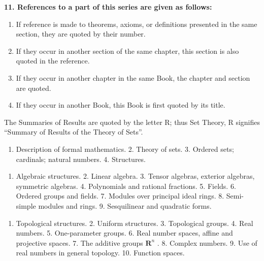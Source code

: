 \par\noindent\textbf{11. References to a part of this series are given as follows:}\par

\begin{enumerate}
\def\labelenumi{\alph{enumi})}
\item
  If reference is made to theorems, axioms, or definitions presented in the same section, they are quoted by their number.
\item
  If they occur in another section of the same chapter, this section is also quoted in the reference.
\item
  If they occur in another chapter in the same Book, the chapter and section are quoted.
\item
  If they occur in another Book, this Book is first quoted by its title.
\end{enumerate}

The Summaries of Results are quoted by the letter R; thus Set Theory, R signifies ``Summary of Results of the Theory of Sets''.



\begin{enumerate}
\def\labelenumi{\arabic{enumi}.}
\tightlist
\item
  Description of formal mathematics. 2. Theory of sets. 3. Ordered sets; cardinals; natural numbers. 4. Structures.
\end{enumerate}


\begin{enumerate}
\def\labelenumi{\arabic{enumi}.}
\tightlist
\item
  Algebraic structures. 2. Linear algebra. 3. Tensor algebras, exterior algebras, symmetric algebras. 4. Polynomials and rational fractions. 5. Fields. 6. Ordered groups and fields. 7. Modules over principal ideal rings. 8. Semi-simple modules and rings. 9. Sesquilinear and quadratic forms.
\end{enumerate}


\begin{enumerate}
\def\labelenumi{\arabic{enumi}.}
\tightlist
\item
  Topological structures. 2. Uniform structures. 3. Topological groups. 4. Real numbers. 5. One-parameter groups. 6. Real number spaces, affine and projective spaces. 7. The additive groups \(\mathbf{R}^n\) . 8. Complex numbers. 9. Use of real numbers in general topology. 10. Function spaces.
\end{enumerate}

